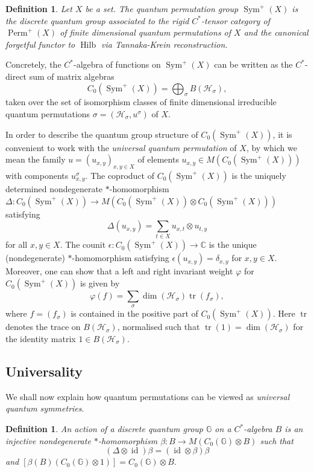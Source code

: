 \documentclass[a4paper]{amsart}
\newcommand*{\Hc}{\mathcal{H}}
\newcommand{\GG}{\mathbb{G}}
\DeclareMathOperator{\id}{id}
\DeclareMathOperator{\tr}{tr}
\DeclareMathOperator{\Hilb}{Hilb}
\DeclareMathOperator{\Perm}{Perm}
\DeclareMathOperator{\Sym}{Sym}
\numberwithin{equation}{section}
\theoremstyle{change}
\newtheorem{definition}[theorem]{Definition}
\begin{document}
\begin{definition}
Let $ X $ be a set. The quantum permutation group $ \Sym^+(X) $ is the discrete quantum group associated to the rigid $ C^* $-tensor category 
of $ \Perm^+(X) $ of finite dimensional quantum permutations of $ X $ and the canonical forgetful functor to $ \Hilb $ via Tannaka-Krein reconstruction. 
\end{definition}

Concretely, the $ C^* $-algebra of functions on $ \Sym^+(X) $ can be written as the $ C^* $-direct sum of matrix algebras
$$
C_0(\Sym^+(X)) = \bigoplus_{\sigma} B(\Hc_\sigma), 
$$
taken over the set of isomorphism classes of finite dimensional irreducible quantum permutations $ \sigma = (\Hc_\sigma, u^\sigma) $ of $ X $. 

In order to describe the quantum group structure of $ C_0(\Sym^+(X)) $, it is convenient to work with the \emph{universal quantum permutation} of $ X $, by which 
we mean the family $ u = (u_{x,y})_{x,y \in X} $ of elements $ u_{x,y} \in M(C_0(\Sym^+(X))) $ with components $ u^\sigma_{x,y} $. 
The coproduct of $ C_0(\Sym^+(X)) $ is the uniquely determined nondegenerate $ * $-homomorphism $ \Delta: C_0(\Sym^+(X)) \rightarrow M(C_0(\Sym^+(X)) \otimes C_0(\Sym^+(X))) $ satisfying 
$$
\Delta(u_{x,y}) = \sum_{t \in X} u_{x,t} \otimes u_{t,y} 
$$
for all $ x,y \in X $. 
The counit $ \epsilon: C_0(\Sym^+(X)) \rightarrow \mathbb{C} $ is the unique (nondegenerate) $ * $-homomorphism satisfying $ \epsilon(u_{x,y}) = \delta_{x,y} $ for $ x,y \in X $. 
Moreover, one can show that a left and right invariant weight $ \varphi $ for $ C_0(\Sym^+(X)) $ is given by  
$$
\varphi(f) = \sum_{\sigma} \dim(\Hc_\sigma) \tr(f_\sigma), 
$$
where $ f = (f_\sigma) $ is contained in the positive part of $ C_0(\Sym^+(X)) $. Here $ \tr $ denotes the trace on $ B(\Hc_\sigma) $, normalised such that $ \tr(1) = \dim(\Hc_\sigma) $ for the identity matrix $ 1 \in B(\Hc_\sigma) $. 


\subsection{Universality} 

We shall now explain how quantum permutations can be viewed as \emph{universal quantum symmetries}. 

\begin{definition} \label{defaction}
An action of a discrete quantum group $ \GG $ on a $ C^* $-algebra $ B $ is an injective 
nondegenerate $ * $-homomorphism $ \beta: B \rightarrow M(C_0(\GG) \otimes B) $ such that 
$$ 
(\Delta \otimes \id) \beta = (\id \otimes \beta) \beta 
$$ 
and $ [\beta(B)(C_0(\GG) \otimes 1)] = C_0(\GG) \otimes B $. 
\end{definition} 
\end{document}
